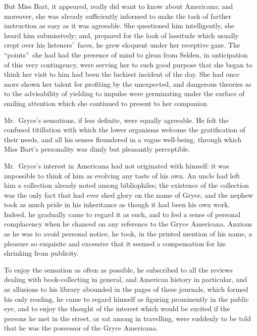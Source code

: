 \documentclass[12pt,a4paper]{book}
\begin{document}
But Miss Bart, it appeared, really did want to know about
Americana; and moreover, she was already sufficiently informed to
make the task of farther instruction as easy as it was agreeable. 
She questioned him intelligently, she heard him submissively;
and, prepared for the look of lassitude which usually crept over
his listeners'\ faces, he grew eloquent under her receptive gaze. 
The ``points''\ she had had the presence of mind to glean from
Selden, in anticipation of this very contingency, were serving
her to such good purpose that she began to think her visit to him
had been the luckiest incident of the day. She had once more
shown her talent for profiting by the unexpected, and dangerous
theories as to the advisability of yielding to impulse were
germinating under the surface of smiling attention which she
continued to present to her companion.





Mr.\ Gryce's sensations, if less definite, were equally agreeable. 
He felt the confused titillation with which the lower organisms
welcome the gratification of their needs, and all his senses
floundered in a vague well-being, through which Miss Bart's
personality was dimly but pleasantly perceptible.





Mr.\ Gryce's interest in Americana had not originated with
himself: it was impossible to think of him as evolving any taste
of his own. An uncle had left him a collection already noted
among bibliophiles; the existence of the collection was
the only fact that had ever shed glory on the name of Gryce, and
the nephew took as much pride in his inheritance as though it had
been his own work. Indeed, he gradually came to regard it as
such, and to feel a sense of personal complacency when he chanced
on any reference to the Gryce Americana. Anxious as he was to
avoid personal notice, he took, in the printed mention of his
name, a pleasure so exquisite and excessive that it seemed a
compensation for his shrinking from publicity.





To enjoy the sensation as often as possible, he subscribed to all
the reviews dealing with book-collecting in general, and American
history in particular, and as allusions to his library abounded
in the pages of these journals, which formed his only reading, he
came to regard himself as figuring prominently in the public eye,
and to enjoy the thought of the interest which would be excited
if the persons he met in the street, or sat among in travelling,
were suddenly to be told that he was the possessor of the Gryce
Americana.
\end{document}

